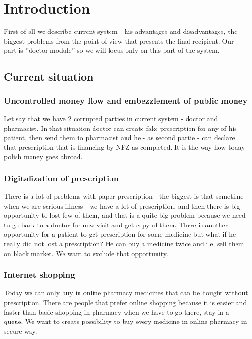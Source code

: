 

\pagestyle{empty}


\newpage

\pagestyle{headings}

\section{Introduction}
First of all we describe current system - his advantages and disadvantages, the biggest problems from the point of view that presents the final recipient. Our part is ''doctor module'' so we will focus only on this part of the system. 
\subsection{Current situation}
\subsubsection{Uncontrolled money flow and embezzlement of public money}
Let say that we have 2 corrupted parties in current system - doctor and pharmacist. In that situation doctor can create fake prescription for any of his patient, then send them to pharmacist and he - as second partie - can declare that prescription that is financing by NFZ as completed. It is the way how today polish money goes abroad. 

\subsubsection{Digitalization of prescription}
There is a lot of problems with paper prescription - the biggest is that sometime - when we are serious illness - we have a lot of prescription, and then there is big opportunity to lost few of them, and that is a quite big problem because we need to go back to a doctor for new visit and get copy of them. There is another opportunity for a patient to get prescription for some medicine but what if he really did not lost a prescription? He can buy a medicine twice and i.e. sell them on black market. We want to exclude that opportunity.

\subsubsection{Internet shopping}
Today we can only buy in online pharmacy medicines that can be bought without prescription. There are people that prefer online shopping because it is easier and faster than basic shopping in pharmacy when we have to go there, stay in a queue. We want to create possibility to buy every medicine in online pharmacy in secure way.

